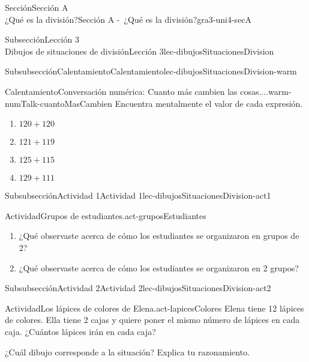 \begin{sectionptx}{Sección}{{\Large Sección A\\}¿Qué es la división?}{}{Sección A -~¿Qué es la división?}{}{}{gra3-uni4-secA}
\begin{subsectionptx}{Subsección}{{\normalsize Lección 3\\[-0.05cm]}Dibujos de situaciones de división}{}{Lección 3}{}{}{lec-dibujosSituacionesDivision}
%
\begin{subsubsectionptx}{Subsubsección}{Calentamiento}{}{Calentamiento}{}{}{lec-dibujosSituacionesDivision-warm}
\begin{exploration}{Calentamiento}{Conversación numérica: Cuanto más cambien las cosas....}{warm-numTalk-cuantoMasCambien}%
Encuentra mentalmente el valor de cada expresión.%
\par
%
\begin{enumerate}[label={\Alph*.}]
\item{}\(\displaystyle 120 + 120\)%
\item{}\(\displaystyle 121 + 119\)%
\item{}\(\displaystyle 125 + 115\)%
\item{}\(\displaystyle 129 + 111\)%
\end{enumerate}
%
\end{exploration}%
\end{subsubsectionptx}
%
%
\typeout{************************************************}
\typeout{************************************************}
%
\begin{subsubsectionptx}{Subsubsección}{Actividad 1}{}{Actividad 1}{}{}{lec-dibujosSituacionesDivision-act1}
\begin{activity}{Actividad}{Grupos de estudiantes.}{act-gruposEstudiantes}%
%
\begin{enumerate}
\item{}¿Qué observaste acerca de cómo los estudiantes se organizaron en grupos de 2?%
\item{}¿Qué observaste acerca de cómo los estudiantes se organizaron en 2 grupos?%
\end{enumerate}
%
\end{activity}%
\end{subsubsectionptx}
%
%
\typeout{************************************************}
\typeout{************************************************}
%
\begin{subsubsectionptx}{Subsubsección}{Actividad 2}{}{Actividad 2}{}{}{lec-dibujosSituacionesDivision-act2}
\begin{activity}{Actividad}{Los lápices de colores de Elena.}{act-lapicesColores}%
Elena tiene 12 lápices de colores. Ella tiene 2 cajas y quiere poner el mismo número de lápices en cada caja. ¿Cuántos lápices irán en cada caja?%
\par
¿Cuál dibujo corresponde a la situación? Explica tu razonamiento.%
\begin{sidebyside}{2}{0}{0}{0}%

\end{sidebyside}
\end{activity}
\end{subsubsectionptx}
\end{subsectionptx}
\end{sectionptx}
